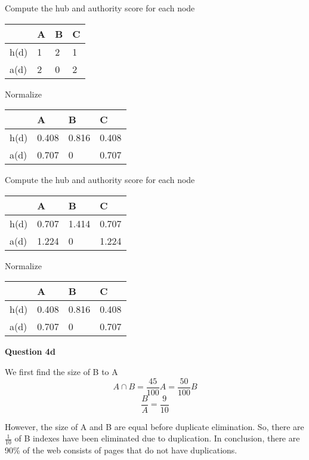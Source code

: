 \documentclass[11pt,a4paper]{report}
\begin{document}
\begin{multicols*}{2}
\noindent Compute the hub and authority score for each node
\begin{center}
\begin{tabular}{ |l|l|l|l| }
    \hline
         & A & B & C \\
    \hline
    h(d) & 1 & 2 & 1 \\
    a(d) & 2 & 0 & 2 \\
    \hline
\end{tabular}
\end{center}

\noindent Normalize
\begin{center}
\begin{tabular}{ |l|l|l|l| }
    \hline
         & A     & B     & C \\
    \hline
    h(d) & 0.408 & 0.816 & 0.408 \\
    a(d) & 0.707 & 0     & 0.707 \\
    \hline
\end{tabular}
\end{center}

\noindent Compute the hub and authority score for each node
\begin{center}
\begin{tabular}{ |l|l|l|l| }
    \hline
         & A     & B     & C \\
    \hline
    h(d) & 0.707 & 1.414 & 0.707 \\
    a(d) & 1.224 & 0     & 1.224 \\
    \hline
\end{tabular}
\end{center}

\noindent Normalize
\begin{center}
\begin{tabular}{ |l|l|l|l| }
    \hline
         & A     & B     & C \\
    \hline
    h(d) & 0.408 & 0.816 & 0.408 \\
    a(d) & 0.707 & 0     & 0.707 \\
    \hline
\end{tabular}
\end{center}

\noindent \textbf{Question 4d}

\noindent We first find the size of B to A
$$A\cap B = \frac{45}{100}A = \frac{50}{100}B$$
$$\frac{B}{A} = \frac{9}{10}$$

\noindent However, the size of A and B are equal before duplicate elimination. So, there are $\frac{1}{10}$ of B indexes have been eliminated due to duplication. In conclusion, there are 90\% of the web consists of pages that do not have duplications.

\end{multicols*}
\end{document}
